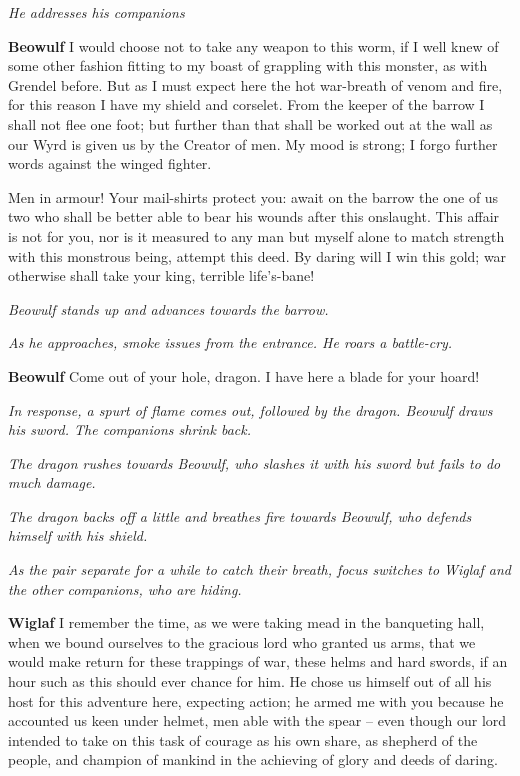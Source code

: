 \documentclass[a4paper]{article}
\begin{document}
{\centerline{\textit{He addresses his companions}}

\textbf{Beowulf} I would choose not to take
any weapon to this worm, if I well knew
of some other fashion fitting to my boast
of grappling with this monster, as with Grendel before.
But as I must expect here the hot war-breath
of venom and fire, for this reason I have
my shield and corselet. From the keeper of the barrow
I shall not flee one foot; but further than that
shall be worked out at the wall as our Wyrd is given us
by the Creator of men. My mood is strong;
I forgo further words against the winged fighter.

Men in armour! Your mail-shirts protect you:
await on the barrow the one of us two
who shall be better able to bear his wounds
after this onslaught. This affair is not for you,
nor is it measured to any man but myself alone
to match strength with this monstrous being,
attempt this deed. By daring will I
win this gold; war otherwise
shall take your king, terrible life’s-bane!

\centerline{\textit{Beowulf stands up and advances towards the barrow.}}
\centerline{\textit{As he approaches, smoke issues from the entrance. He roars a battle-cry.}}

\textbf{Beowulf} Come out of your hole, dragon.
I have here a blade for your hoard!

\centerline{\textit{In response, a spurt of flame comes out, followed by the dragon. Beowulf draws his sword. The companions shrink back.}}

\centerline{\textit{The dragon rushes towards Beowulf, who slashes it with his sword but fails to do much damage.}}
\centerline{\textit{The dragon backs off a little and breathes fire towards Beowulf, who defends himself with his shield.}}
\centerline{\textit{As the pair separate for a while to catch their breath, focus switches to Wiglaf and the other companions, who are hiding.}}

\textbf{Wiglaf} I remember the time, as we were taking mead
in the banqueting hall, when we bound ourselves
to the gracious lord who granted us arms,
that we would make return for these trappings of war,
these helms and hard swords, if an hour such as this
should ever chance for him. He chose us himself
out of all his host for this adventure here,
expecting action; he armed me with you
because he accounted us keen under helmet,
men able with the spear – even though our lord
intended to take on this task of courage
as his own share, as shepherd of the people,
and champion of mankind in the achieving of glory
and deeds of daring.

}
\end{document}
